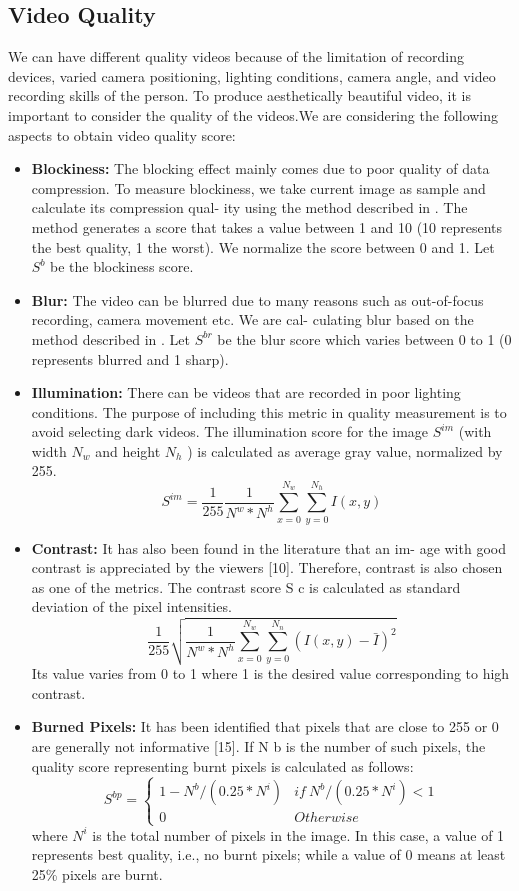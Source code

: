 \documentclass{sig-alternate}
\providecommand{\DIFadd}[1]{{\protect\color{blue}\uwave{#1}}} %
\providecommand{\DIFaddbegin}{} %
\providecommand{\DIFaddend}{} %
\begin{document}
\subsection{Video Quality}
\DIFaddbegin \DIFadd{I am a new sentence.
}\DIFaddend We can have different quality videos because of the limitation of
recording devices, varied camera positioning, lighting conditions,
camera angle, and video recording skills of the person. To produce
aesthetically beautiful video, it is important to consider the quality
of the videos.We are considering the following aspects to obtain
video quality score:
 \begin{itemize} 
\item \textbf{Blockiness:} The blocking effect mainly comes due to poor
quality of data compression. To measure blockiness, we take
current image as sample and calculate its compression qual-
ity using the method described in \cite{salas:eighteen}. The method generates
a score that takes a value between 1 and 10 (10 represents the
best quality, 1 the worst). We normalize the score between 0
and 1. Let $S^b$ be the blockiness score.
\item \textbf{Blur:} The video can be blurred due to many reasons such as
out-of-focus recording, camera movement etc. We are cal-
culating blur based on the method described in \cite{salas:five}. Let $S^{br}$
be the blur score which varies between 0 to 1 (0 represents
blurred and 1 sharp).
\item \textbf{Illumination:} There can be videos that are recorded in poor
lighting conditions. The purpose of including this metric in
quality measurement is to avoid selecting dark videos. The
illumination score for the image $S^{im}$ (with width $N_w$ and
height $N_h$ ) is calculated as average gray value, normalized
by 255.
\[S^{im}=\frac{1}{255}\frac{1}{N^w*N^h}\sum_{x=0}^{N_w}\sum_{y=0}^{N_h}I(x,y)\tag{9}\]
\item \textbf{Contrast:} It has also been found in the literature that an im-
age with good contrast is appreciated by the viewers [10].
Therefore, contrast is also chosen as one of the metrics. The
contrast score S c is calculated as standard deviation of the
pixel intensities.
\[\frac{1}{255}\sqrt{\frac{1}{N^w*N^h}\sum_{x=0}^{N_w}\sum_{y=0}^{N_n}(I(x,y)-\bar{I})^2}\tag{10}\]
Its value varies from 0 to 1 where 1 is the desired value corresponding to high contrast.
\item \textbf{Burned Pixels:} It has been identified that pixels that are
close to 255 or 0 are generally not informative [15]. If N b
is the number of such pixels, the quality score representing
burnt pixels is calculated as follows:
\[S^{bp}=\left\{\begin{matrix} 1-N^b/(0.25*N^i) & if\ N^b/(0.25*N^i)<1 \\ 0 & Otherwise \end{matrix}\right.\tag{11}\]
where $N^i$ is the total number of pixels in the image. In this
case, a value of 1 represents best quality, i.e., no burnt pixels;
while a value of 0 means at least 25\% pixels are burnt.


\end{itemize}
\end{document}
